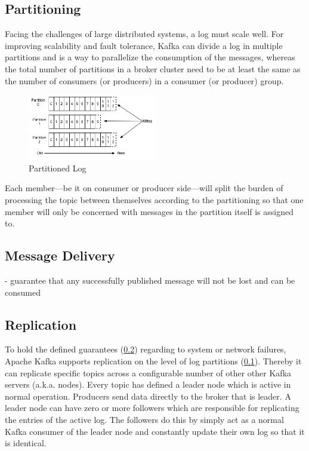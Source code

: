 \subsection{Partitioning}
\label{kafka-partitioning}
Facing the challenges of large distributed systems, a log must scale well. For
improving scalability and fault tolerance, Kafka can divide a log in multiple
partitions and is a way to parallelize the consumption of the messages, whereas
the total number of partitions in a broker cluster need to be at least the same
as the number of consumers (or producers) in a consumer (or producer) group.

\begin{figure}[H]
    \centering
    \includegraphics[width=0.5\textwidth]{images/log_anatomy.png}
    \caption{Partitioned Log \cite{apachekafka}}
    \label{fig:the-log}
\end{figure}

Each member---be it on consumer or producer side---will split the burden of
processing the topic between themselves according to the partitioning so that
one member will only be concerned with messages in the partition itself is
assigned to. 

\subsection{Message Delivery}
\label{kafka-message-delivery}

- guarantee that any successfully published message will not be lost and can be
 consumed

\subsection{Replication}
To hold the defined guarantees (\ref{kafka-message-delivery}) regarding to system
or network failures, Apache Kafka supports \gls{replication} on the level of log
partitions (\ref{kafka-partitioning}). Thereby it can replicate specific topics
across a configurable number of other other Kafka servers (a.k.a. nodes). Every
topic has defined a leader node which is active in normal operation. Producers
send data directly to the broker that is leader. A leader node can have zero or
more followers which are responsible for replicating the entries of the active
log. The followers do this by simply act as a normal Kafka consumer of the
leader node and constantly update their own log so that it is identical.
\cite{apachekafka}

